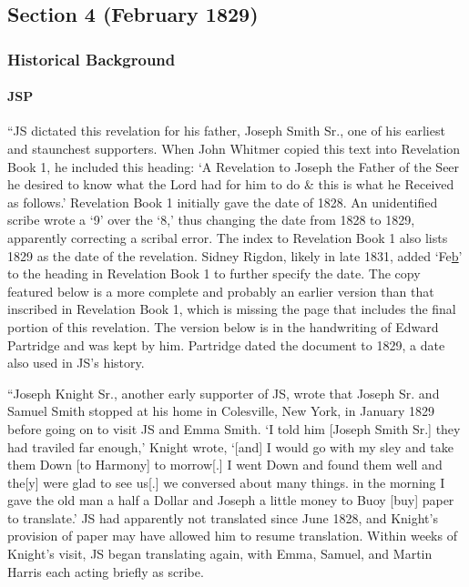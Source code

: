\subsection{Section 4 (February 1829)}
	\label{DC4}
	
	\subsubsection{Historical Background}
		\label{DC4-HB}
		
		\paragraph{JSP}
		
			``JS dictated this revelation for his father, Joseph Smith Sr., one of his earliest and staunchest supporters. When John Whitmer copied this text into Revelation Book 1, he included this heading: `A Revelation to Joseph the Father of the Seer he desired to know what the Lord had for him to do \& this is what he Received as follows.' Revelation Book 1 initially gave the date of 1828. An unidentified scribe wrote a `9' over the `8,' thus changing the date from 1828 to 1829, apparently correcting a scribal error. The index to Revelation Book 1 also lists 1829 as the date of the revelation. Sidney Rigdon, likely in late 1831, added `Fe\uline{b}' to the heading in Revelation Book 1 to further specify the date. The copy featured below is a more complete and probably an earlier version than that inscribed in Revelation Book 1, which is missing the page that includes the final portion of this revelation. The version below is in the handwriting of Edward Partridge and was kept by him. Partridge dated the document to 1829, a date also used in JS's history.
			
			``Joseph Knight Sr., another early supporter of JS, wrote that Joseph Sr. and Samuel Smith stopped at his home in Colesville, New York, in January 1829 before going on to visit JS and Emma Smith. `I told him [Joseph Smith Sr.] they had traviled far enough,' Knight wrote, `[and] I would go with my sley and take them Down [to Harmony] to morrow[.] I went Down and found them well and the[y] were glad to see us[.] we conversed about many things. in the morning I gave the old man a half a Dollar and Joseph a little money to Buoy [buy] paper to translate.' JS had apparently not translated since June 1828, and Knight's provision of paper may have allowed him to resume translation. Within weeks of Knight's visit, JS began translating again, with Emma, Samuel, and Martin Harris each acting briefly as scribe.
			
